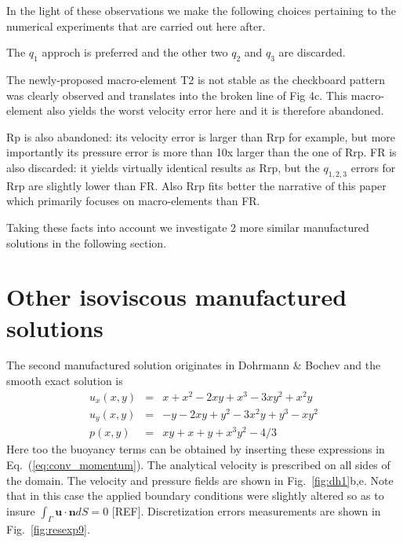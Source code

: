 \documentclass[a4paper,12pt]{article}
\begin{document}

In the light of these observations we make the following choices pertaining to the 
numerical experiments that are carried out here after.

The $q_1$ approch is preferred and the other two $q_2$ and $q_3$ are discarded.

The newly-proposed macro-element T2 is not stable as the checkboard pattern was clearly observed
and translates into the broken line of Fig 4c. This macro-element also yields the worst 
velocity error here and it is therefore abandoned. 

Rp is also abandoned: its velocity error is larger than Rrp for example, but 
more importantly its pressure error is more than 10x larger than the one of Rrp.
FR is also discarded: it yields virtually identical results as Rrp, but the $q_{1,2,3}$ errors for Rrp 
are slightly lower than FR. Also Rrp fits better the narrative of this paper  
which primarily focuses on macro-elements than FR.

Taking these facts into account we investigate 2 more similar manufactured solutions 
in the following section. 

\section{Other isoviscous manufactured solutions}


The second manufactured solution originates in Dohrmann \& Bochev \cite{dobo04} 
and the smooth exact solution is
\begin{eqnarray}
u_x(x,y) &=& x+x^2 - 2xy+x^3 - 3xy^2 + x^2y \\
u_y(x,y) &=& -y-2xy+y^2 -3x^2y + y^3 - xy^2 \\
p(x,y) &=& xy+x+y+x^3y^2 - 4/3
\end{eqnarray}
Here too the buoyancy terms can be obtained by inserting these expressions
in Eq.~(\ref{eq:conv_momentum}).
The analytical velocity is prescribed on all sides of the domain.
The velocity and pressure fields are shown in Fig.~\ref{fig:dh1}b,e.
Note that in this case the applied boundary conditions were slightly
altered so as to insure $\int_\Gamma {\bm u}\cdot{\bm n} dS =0$ [REF].
Discretization errors measurements are shown in Fig.~\ref{fig:resexp9}.
\end{document}
